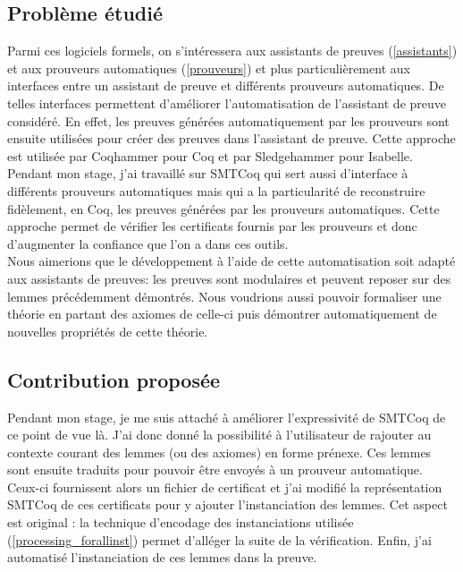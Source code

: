 \documentclass[11pt]{article}
\begin{document}
\subsection{Problème étudié}

Parmi ces logiciels formels, on s'intéressera aux assistants de preuves (\ref{assistants}) et aux prouveurs automatiques (\ref{prouveurs}) et plus particulièrement aux interfaces entre un assistant de preuve et différents prouveurs automatiques.  De telles interfaces permettent d'améliorer l'automatisation de l'assistant de preuve considéré. En effet, les preuves générées automatiquement par les prouveurs sont ensuite utilisées pour créer des preuves dans l'assistant de preuve. Cette approche est utilisée par Coqhammer \cite{coqhammer} pour Coq et par Sledgehammer \cite{sledgehammer_manual} pour Isabelle. \\
Pendant mon stage, j'ai travaillé sur SMTCoq qui sert aussi d'interface à différents prouveurs automatiques mais qui a la particularité de reconstruire fidèlement, en Coq, les preuves générées par les prouveurs automatiques. Cette approche permet de vérifier les certificats fournis par les prouveurs et donc d'augmenter la confiance que l'on a dans ces outils.\\

Nous aimerions que le développement à l'aide de cette automatisation soit adapté aux assistants de preuves: les preuves sont modulaires et peuvent reposer sur des lemmes précédemment démontrés. Nous voudrions aussi pouvoir formaliser une théorie en partant des axiomes de celle-ci puis démontrer automatiquement de nouvelles propriétés de cette théorie.

\subsection{Contribution proposée}

Pendant mon stage, je me suis attaché à améliorer l'expressivité de SMTCoq de ce point de vue là. J'ai donc donné la possibilité à l'utilisateur de rajouter au contexte courant des lemmes (ou des axiomes) en forme prénexe. Ces lemmes sont ensuite traduits pour pouvoir être envoyés à un prouveur automatique. Ceux-ci fournissent alors un fichier de certificat et j'ai modifié la représentation SMTCoq de ces certificats pour y ajouter l'instanciation des lemmes. Cet aspect est original : la technique d'encodage des instanciations utilisée (\ref{processing_forallinst}) permet d'alléger la suite de la vérification. Enfin, j'ai automatisé l'instanciation de ces lemmes dans la preuve.
\end{document}
